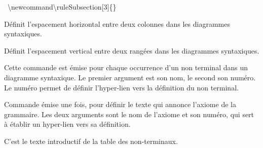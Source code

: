 \mbox{\ttfamily\footnotesize
\textbackslash newcommand\textbackslash ruleSubsection[3]\{\}
}





Définit l'espacement horizontal entre deux colonnes dans les diagrammes syntaxiques.




Définit l'espacement vertical entre deux rangées dans les diagrammes syntaxiques.




Cette commande est émise pour chaque occurrence d'un non terminal dans un diagramme syntaxique. Le premier argument est son nom, le second son numéro. Le numéro permet de définir l'hyper-lien vers la définition du non terminal.




Commande émise une fois, pour définir le texte qui annonce l'axiome de la grammaire. Les deux arguments sont le nom de l'axiome et son numéro, qui sert à établir un hyper-lien vers sa définition.





C'est le texte introductif de la table des non-terminaux.




